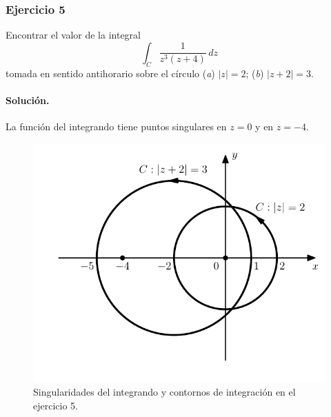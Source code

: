 \documentclass[a4paper]{report}
\begin{document}
\subsubsection*{Ejercicio 5}

Encontrar el valor de la integral
\[
 \int_C\frac{1}{z^3(z+4)}\,dz
\]
tomada en sentido antihorario sobre el círculo (\textit{a}) \(|z|=2\); (\textit{b}) \(|z+2|=3\).

\paragraph{Solución.}

La función del integrando tiene puntos singulares en \(z=0\) y en \(z=-4\).
\begin{figure}[!htb]
  \begin{minipage}[c]{0.58\textwidth}
    \includegraphics[width=\textwidth]{figuras/exercise_81_05.pdf}
  \end{minipage}\hfill
  \begin{minipage}[c]{0.32\textwidth}
    \caption{
       Singularidades del integrando y contornos de integración en el ejercicio 5.
    }\label{fig:exercise_81_05}
  \end{minipage}
\end{figure}
 
\end{document}
